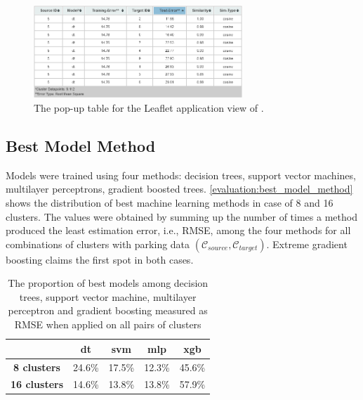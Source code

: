\begin{figure}[!ht]
	\centering
	\includegraphics[width=0.7\textwidth]{graphics/cwith_source_dt_cosine_table.png}
	\caption{The pop-up table for the Leaflet application view of  .}
	\label{fig:cwith_table}
\end{figure}

\subsection{Best Model Method}
\label{evaluation:best_model}
Models were trained using four methods: decision trees, support vector machines, multilayer perceptrons, gradient boosted trees. \autoref{evaluation:best_model_method} shows the distribution of best machine learning methods in case of 8 and 16 clusters.
The values were obtained by summing up the number of times a method produced the least estimation error, i.e., RMSE, among the four methods for all combinations of clusters with parking data $(\mathcal{C}_{source}, \mathcal{C}_{target})$.
Extreme gradient boosting claims the first spot in both cases.

\begin{table}[!ht]
	\centering
	\small
	\setlength\extrarowheight{5pt}
	\begin{tabular}{ | c | c | c | c | c |}
		\hline
		& \textbf{dt} & \textbf{svm} & \textbf{mlp} & \textbf{xgb} \\ \hline
		\textbf{8 clusters} & 24.6\% & 17.5\% & 12.3\% & 45.6\% \\ \hline
		\textbf{16 clusters} & 14.6\% & 13.8\% & 13.8\% & 57.9\% \\ \hline
	\end{tabular}
	\caption{The proportion of best models among decision trees, support vector machine, multilayer perceptron and gradient boosting  measured as RMSE when applied on all pairs of clusters}
	\label{evaluation:best_model_method}
\end{table}

